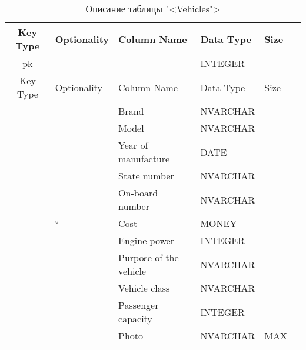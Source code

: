 \begin{xltabular}{\textwidth}{|c|X|X|X|X|X|}
	\caption{Описание таблицы "<Vehicles">\label{prod:table8}}\\ \hline
	\centrow Key Type & \centrow Optionality & \centrow Column Name & \centrow Data Type & \centrow Size \\ \hline
	\centrow pk & \centrow * &  & \centrow INTEGER & \\ \hline
	\endfirsthead
	\centrow Key Type & \centrow Optionality & \centrow Column Name & \centrow Data Type & \centrow Size \\ \hline
	\finishhead
	& \centrow * & \centrow Brand & \centrow NVARCHAR &  \\ \hline 
	& \centrow * & \centrow Model & \centrow NVARCHAR &  \\ \hline
	& \centrow * & \centrow Year of manufacture & \centrow DATE & \centrow \\ \hline 
	& \centrow * & \centrow State number & \centrow NVARCHAR &  \\ \hline 
	& \centrow * & \centrow On-board number & \centrow NVARCHAR &  \\ \hline
	& \centrow ° & \centrow Cost & \centrow MONEY & \centrow \\ \hline 
	& \centrow * & \centrow Engine power & \centrow INTEGER & \centrow \\ \hline 
	& \centrow * & \centrow Purpose of the vehicle & \centrow NVARCHAR &  \\ \hline
	& \centrow * & \centrow Vehicle class & \centrow NVARCHAR &  \\ \hline
	& \centrow * & \centrow Passenger capacity & \centrow INTEGER & \centrow \\ \hline
	& \centrow * & \centrow Photo & \centrow NVARCHAR & \centrow MAX \\ \hline
\end{xltabular}

